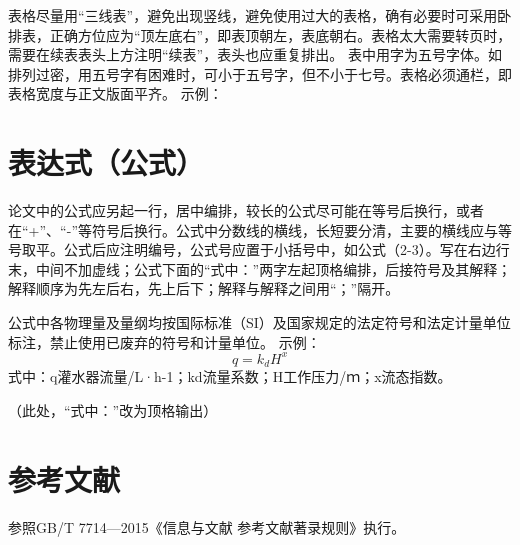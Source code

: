 表格尽量用“三线表”，避免出现竖线，避免使用过大的表格，确有必要时可采用卧排表，正确方位应为“顶左底右”，即表顶朝左，表底朝右。表格太大需要转页时，需要在续表表头上方注明“续表”，表头也应重复排出。
表中用字为五号字体。如排列过密，用五号字有困难时，可小于五号字，但不小于七号。表格必须通栏，即表格宽度与正文版面平齐。
示例：
\begin{table}[htp]
    \centering
    \label{tab:demo}    
\end{table}
\section{表达式（公式）}
论文中的公式应另起一行，居中编排，较长的公式尽可能在等号后换行，或者在“+”、“-”等符号后换行。公式中分数线的横线，长短要分清，主要的横线应与等号取平。公式后应注明编号，公式号应置于小括号中，如公式（2-3）。写在右边行末，中间不加虚线；公式下面的“式中：”两字左起顶格编排，后接符号及其解释；解释顺序为先左后右，先上后下；解释与解释之间用“；”隔开。

公式中各物理量及量纲均按国际标准（SI）及国家规定的法定符号和法定计量单位标注，禁止使用已废弃的符号和计量单位。
示例：
\begin{equation}
\label{eq:demo}
q=k_dH^x
\end{equation}
式中：q\cdash 灌水器流量/L·h-1；kd\cdash 流量系数；H\cdash 工作压力/ｍ；x\cdash 流态指数。 

（此处，“式中：”改为顶格输出）

\section{参考文献}
参照GB/T 7714—2015《信息与文献 参考文献著录规则》执行。
